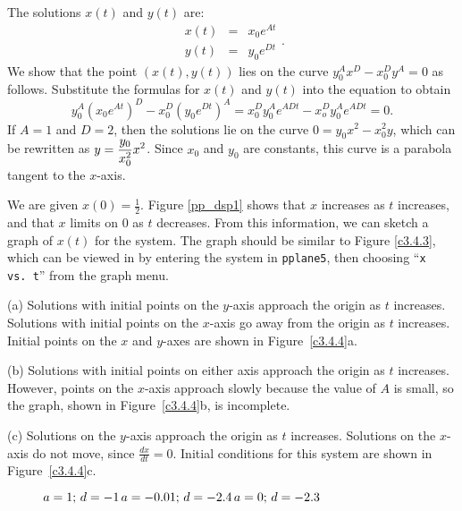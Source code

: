 The solutions $x(t)$ and $y(t)$ are:
\[
\begin{array}{rcl}
x(t) & = & x_0e^{At} \\
y(t) & = & y_0e^{Dt}\end{array}.
\]
We show that the point $(x(t),y(t))$ lies on the curve
$y_0^Ax^D - x_0^Dy^A = 0$ as follows.  Substitute the formulas for
$x(t)$ and $y(t)$ into the equation to obtain
\[
y_0^A\left(x_0e^{At}\right)^D - x_0^D\left(y_0e^{Dt}\right)^A =
x_0^Dy_0^Ae^{ADt} - x_o^Dy_0^Ae^{ADt} = 0.
\]
If $A = 1$ and $D = 2$, then the solutions lie on the curve
$0 = y_0x^2 - x_0^2y$, which can be rewritten as
$y = \displaystyle \frac{y_0}{x_0^2}x^2$.
Since $x_0$ and $y_0$ are constants, this curve is a parabola
tangent to the $x$-axis.

We are given $x(0) = \frac{1}{2}$.  Figure \ref{pp_dsp1}
shows that $x$ increases as $t$
increases, and that $x$ limits on $0$ as $t$ decreases.  From
this information, we can sketch a graph of $x(t)$ for the system.
The graph should be similar to Figure \ref{c3.4.3}, which can
be viewed in \Matlab by entering the system in {\tt pplane5},
then choosing ``{\tt x vs.\ t}'' from the graph menu.

\begin{figure}[htb]
                       \centerline{%
                       }
\end{figure}

(a) Solutions with initial points on the $y$-axis approach the
origin as $t$ increases.  Solutions with initial points on the
$x$-axis go away from the origin as $t$ increases.  Initial points
on the $x$ and $y$-axes are shown in Figure~\ref{c3.4.4}a.

(b) Solutions with initial points on either axis approach the
origin as $t$ increases.  However, points on the $x$-axis
approach slowly because the value of $A$ is small, so the \Matlab
graph, shown in Figure~\ref{c3.4.4}b, is incomplete.

(c) Solutions on the $y$-axis approach the origin as $t$
increases.  Solutions on the $x$-axis do not move, since
$\frac{dx}{dt} = 0$.  Initial conditions for this system are shown
in Figure~\ref{c3.4.4}c.

\begin{figure}[htb]
                       \centerline{%
                       }
	\centerline{$a = 1\hbox{; }d = -1$\hspace{0.7in}$a = -0.01\hbox{; }d = -2.4$\hspace{0.7in}$a = 0\hbox{; }d = -2.3$}
\end{figure}

